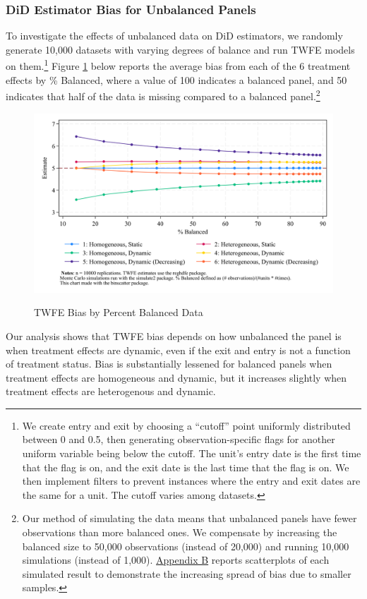 \documentclass[12pt]{article}
\begin{document}
\subsubsection{DiD Estimator Bias for Unbalanced Panels}
To investigate the effects of unbalanced data on DiD estimators, we randomly generate 10,000 datasets with varying degrees of balance and run TWFE models on them.\footnote{We create entry and exit by choosing a “cutoff” point uniformly distributed between 0 and 0.5, then generating observation-specific flags for another uniform variable being below the cutoff. The unit’s entry date is the first time that the flag is on, and the exit date is the last time that the flag is on. We then implement filters to prevent instances where the entry and exit dates are the same for a unit. The cutoff varies among datasets.}  Figure \ref{fig:pc-balance} below reports the average bias from each of the 6 treatment effects by \% Balanced, where a value of 100 indicates a balanced panel, and 50 indicates that half of the data is missing compared to a balanced panel.\footnote{Our method of simulating the data means that unbalanced panels have fewer observations than more balanced ones. We compensate by increasing the balanced size to 50,000 observations (instead of 20,000) and running 10,000 simulations (instead of 1,000). \hyperref[sec:appendixb]{Appendix B} reports scatterplots of each simulated result to demonstrate the increasing spread of bias due to smaller samples.}
\begin{figure}[H]
    \centering
    \caption{TWFE Bias by Percent Balanced Data}
    \includegraphics[width=6in]{Figures/TWFE Bias by Percent Balanced Crop.png}
    \label{fig:pc-balance}
\end{figure}
\noindent
Our analysis shows that TWFE bias depends on how unbalanced the panel is when treatment effects are dynamic, even if the exit and entry is not a function of treatment status. Bias is substantially lessened for balanced panels when treatment effects are homogeneous and dynamic, but it increases slightly when treatment effects are heterogenous and dynamic.
\end{document}
